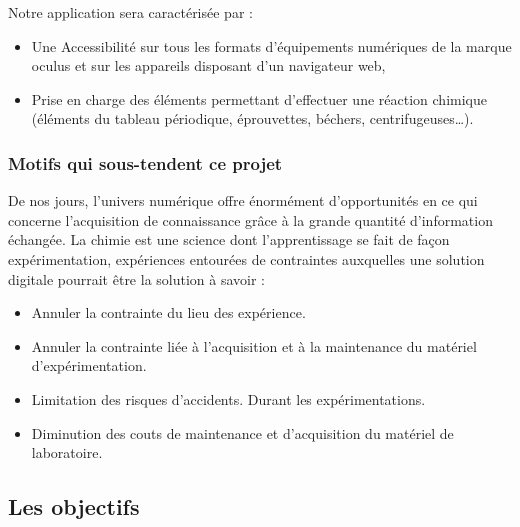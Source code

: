 Notre application sera caractérisée par :

\begin{itemize}
	\item Une Accessibilité sur tous les formats d’équipements numériques de la marque oculus et sur les appareils disposant d’un navigateur web,
	\item Prise en charge des éléments permettant d’effectuer une réaction chimique (éléments du tableau périodique, éprouvettes, béchers, centrifugeuses…).
\end{itemize}

\subsubsection{Motifs qui sous-tendent ce projet}

De nos jours, l’univers numérique offre énormément d'opportunités en ce qui concerne l'acquisition de connaissance grâce à la grande quantité d’information échangée. La chimie est une science dont l'apprentissage se fait de façon expérimentation, expériences entourées de contraintes auxquelles une solution digitale pourrait être la solution à savoir :

\begin{itemize}
	\item Annuler la contrainte du lieu des expérience.
	\item Annuler la contrainte liée à l’acquisition et à la maintenance du matériel d'expérimentation.
	\item Limitation des risques d’accidents. Durant les expérimentations.
	\item Diminution des couts de maintenance et d’acquisition du matériel de laboratoire.
\end{itemize}

\subsection{Les objectifs}

